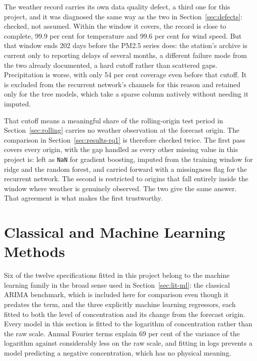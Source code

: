 \documentclass[12pt,a4paper]{report}
\begin{document}
The weather record carries its own data quality defect, a third one for this
project, and it was diagnosed the same way as the two in
Section~\ref{sec:defects}: checked, not assumed. Within the
window it covers, the record is close to complete, 99.9 per cent for
temperature and 99.6 per cent for wind speed. But that window ends 202 days
before the PM2.5 series does: the station's archive is current only to
reporting delays of several months, a different failure mode from the two
already documented, a hard cutoff rather than scattered gaps. Precipitation
is worse, with only 54 per cent coverage even before that cutoff. It is
excluded from the recurrent network's channels for this reason and retained only
for the tree models, which take a sparse column natively without needing
it imputed.

That cutoff means a meaningful share of the rolling-origin test period in
Section~\ref{sec:rolling} carries no weather observation at the forecast
origin. The comparison in Section~\ref{sec:results-rq1} is therefore checked
twice. The first pass covers every origin, with the gap handled as every
other missing value in this project is: left as \texttt{NaN} for gradient
boosting, imputed from the training window for ridge and the random forest,
and carried forward with a missingness flag for the recurrent network. The
second is restricted to origins that fall entirely inside the window where
weather is genuinely observed. The two give the same answer. That agreement
is what makes the first trustworthy.

\section{Classical and Machine Learning Methods}
\label{sec:ml-methods}

Six of the twelve specifications fitted in this project belong to the machine
learning family in the broad sense used in Section~\ref{sec:lit-ml}: the
classical ARIMA benchmark, which is included here for comparison even though
it predates the term, and the three explicitly machine learning regressors,
each fitted to both the level of concentration and its change from the
forecast origin. Every model in this section is fitted to the logarithm of
concentration rather than the raw scale. Annual Fourier terms explain 69 per
cent of the variance of the logarithm against considerably less on the raw
scale, and fitting in logs prevents a model predicting a negative
concentration, which has no physical meaning.
\end{document}
